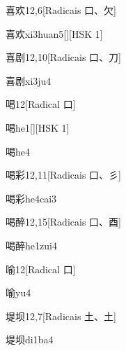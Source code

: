 \begin{entry}{喜欢}{12,6}[Radicais ⼝、⽋]
  \begin{phonetics}{喜欢}{xi3huan5}[][HSK 1]
  \end{phonetics}
\end{entry}

\begin{entry}{喜剧}{12,10}[Radicais ⼝、⼑]
  \begin{phonetics}{喜剧}{xi3ju4}
  \end{phonetics}
\end{entry}

\begin{entry}{喝}{12}[Radical ⼝]
  \begin{phonetics}{喝}{he1}[][HSK 1]
  \end{phonetics}
  \begin{phonetics}{喝}{he4}
  \end{phonetics}
\end{entry}

\begin{entry}{喝彩}{12,11}[Radicais ⼝、⼺]
  \begin{phonetics}{喝彩}{he4cai3}
  \end{phonetics}
\end{entry}

\begin{entry}{喝醉}{12,15}[Radicais ⼝、⾣]
  \begin{phonetics}{喝醉}{he1zui4}
  \end{phonetics}
\end{entry}

\begin{entry}{喻}{12}[Radical ⼝]
  \begin{phonetics}{喻}{yu4}
  \end{phonetics}
\end{entry}

\begin{entry}{堤坝}{12,7}[Radicais ⼟、⼟]
  \begin{phonetics}{堤坝}{di1ba4}
  \end{phonetics}
\end{entry}

